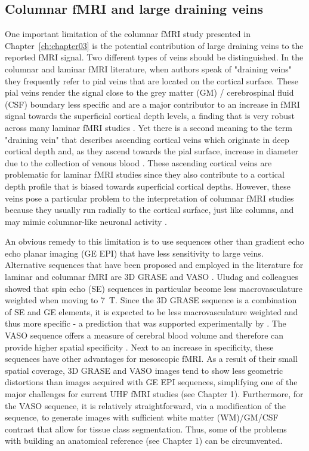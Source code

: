 \subsection{Columnar fMRI and large draining veins}
One important limitation of the columnar fMRI study presented in Chapter~\ref{ch:chapter03} is the potential contribution of large draining veins to the reported fMRI signal. Two different types of veins should be distinguished. In the columnar and laminar fMRI literature, when authors speak of "draining veins" they frequently refer to pial veins that are located on the cortical surface. These pial veins render the signal close to the grey matter (GM) / cerebrospinal fluid (CSF) boundary less specific \parencite{Polimeni2010, Moerel2017} and are a major contributor to an increase in fMRI signal towards the superficial cortical depth levels, a finding that is very robust across many laminar fMRI studies \parencite{Ress2007, Koopmans2010, Polimeni2010, Koopmans2011, DeMartino2013, Marquardt2018}. Yet there is a second meaning to the term "draining vein" that describes ascending cortical veins which originate in deep cortical depth and, as they ascend towards the pial surface, increase in diameter due to the collection of venous blood \parencite{Duvernoy1981}. These ascending cortical veins are problematic for laminar fMRI studies since they also contribute to a cortical depth profile that is biased towards superficial cortical depths. However, these veins pose a particular problem to the interpretation of columnar fMRI studies because they usually run radially to the cortical surface, just like columns, and may mimic columnar-like neuronal activity \parencite{DeMartino2016}.

An obvious remedy to this limitation is to use sequences other than gradient echo echo planar imaging (GE EPI) that have less sensitivity to large veins. Alternative sequences that have been proposed and employed in the literature for laminar and columnar fMRI are 3D GRASE \parencite{Feinberg2008, Zimmermann2011, DeMartino2013, Kemper2015, Moerel2017} and VASO \parencite{Huber2015, Huber2017}. Uludag and colleagues \parencite*{Uludag2009} showed that spin echo (SE) sequences in particular become less macrovasculature weighted when moving to 7~T. Since the 3D GRASE sequence is a combination of SE and GE elements, it is expected to be less macrovasculature weighted and thus more specific - a prediction that was supported experimentally by \cite{DeMartino2013}. The VASO sequence offers a measure of cerebral blood volume and therefore can provide higher spatial specificity \parencite{Huber2015, Huber2017}. Next to an increase in specificity, these sequences have other advantages for mesoscopic fMRI. As a result of their small spatial coverage, 3D GRASE and VASO images tend to show less geometric distortions than images acquired with GE EPI sequences, simplifying one of the major challenges for current UHF fMRI studies (see Chapter 1). Furthermore, for the VASO sequence, it is relatively straightforward, via a modification of the sequence, to generate images with sufficient white matter (WM)/GM/CSF contrast that allow for tissue class segmentation. Thus, some of the problems with building an anatomical reference (see Chapter 1) can be circumvented.

